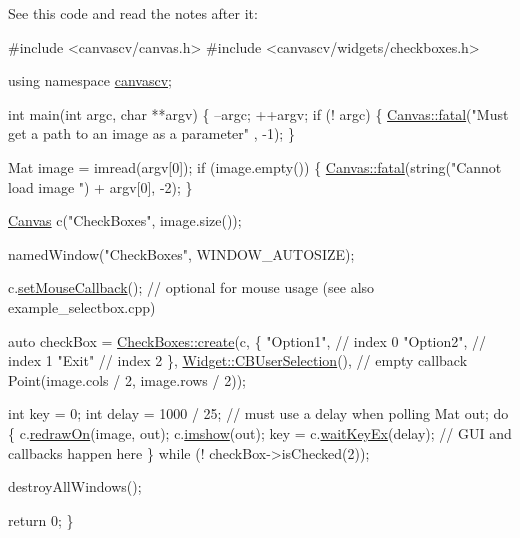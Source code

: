 See this code and read the notes after it\+: 
\begin{DoxyCode}
\textcolor{preprocessor}{#include <canvascv/canvas.h>}
\textcolor{preprocessor}{#include <canvascv/widgets/checkboxes.h>}

\textcolor{keyword}{using namespace }\hyperlink{namespacecanvascv}{canvascv};

\textcolor{keywordtype}{int} main(\textcolor{keywordtype}{int} argc, \textcolor{keywordtype}{char} **argv)
\{
    --argc;
    ++argv;
    \textcolor{keywordflow}{if} (! argc)
    \{
        \hyperlink{classcanvascv_1_1Canvas_add93c0d5cc1e9b49f97510952a8a1961}{Canvas::fatal}(\textcolor{stringliteral}{"Must get a path to an image as a parameter"} , -1);
    \}

    Mat image = imread(argv[0]);
    \textcolor{keywordflow}{if} (image.empty())
    \{
        \hyperlink{classcanvascv_1_1Canvas_add93c0d5cc1e9b49f97510952a8a1961}{Canvas::fatal}(\textcolor{keywordtype}{string}(\textcolor{stringliteral}{"Cannot load image "}) + argv[0], -2);
    \}

    \hyperlink{classcanvascv_1_1Canvas}{Canvas} c(\textcolor{stringliteral}{"CheckBoxes"}, image.size());

    namedWindow(\textcolor{stringliteral}{"CheckBoxes"}, WINDOW\_AUTOSIZE);

    c.\hyperlink{classcanvascv_1_1Canvas_acf6e5d4b40aec610b0dc8c4f6bf93ac1}{setMouseCallback}(); \textcolor{comment}{// optional for mouse usage (see also example\_selectbox.cpp)}

    \textcolor{keyword}{auto} checkBox = \hyperlink{classcanvascv_1_1CheckBoxes_a5108f52385a5cb19ad7fe52a18a91df0}{CheckBoxes::create}(c, \{
                                           \textcolor{stringliteral}{"Option1"}, \textcolor{comment}{// index 0}
                                           \textcolor{stringliteral}{"Option2"}, \textcolor{comment}{// index 1}
                                           \textcolor{stringliteral}{"Exit"}     \textcolor{comment}{// index 2}
                                       \},
                                       \hyperlink{classcanvascv_1_1Widget_a977cbd39cf203c5866f07f3645c7e4bc}{Widget::CBUserSelection}(), \textcolor{comment}{// empty callback}
                                       Point(image.cols / 2, image.rows / 2));

    \textcolor{keywordtype}{int} key = 0;
    \textcolor{keywordtype}{int} delay = 1000 / 25; \textcolor{comment}{// must use a delay when polling}
    Mat out;
    \textcolor{keywordflow}{do}
    \{
        c.\hyperlink{classcanvascv_1_1Canvas_a018c66e277de7904b8146ea3f3feebdd}{redrawOn}(image, out);
        c.\hyperlink{classcanvascv_1_1Canvas_acaf9494a5668046dd0a8908aa97a7a43}{imshow}(out);
        key = c.\hyperlink{classcanvascv_1_1Canvas_a59397db05f5d9e45264f626f6a2ae528}{waitKeyEx}(delay); \textcolor{comment}{// GUI and callbacks happen here}
    \} \textcolor{keywordflow}{while} (! checkBox->isChecked(2));

    destroyAllWindows();

    \textcolor{keywordflow}{return} 0;
\}
\end{DoxyCode}
